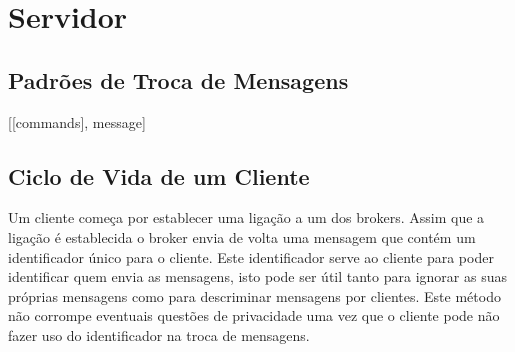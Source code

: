 \section{Servidor}

\subsection{Padrões de Troca de Mensagens}

[[commands], message]

\subsection{Ciclo de Vida de um Cliente}

Um cliente começa por establecer uma ligação a um dos brokers. Assim que a ligação é establecida o broker envia de volta uma mensagem que contém um identificador único para o cliente. Este identificador serve ao cliente para poder identificar quem envia as mensagens, isto pode ser útil tanto para ignorar as suas próprias mensagens como para descriminar mensagens por clientes. Este método não corrompe eventuais questões de privacidade uma vez que o cliente pode não fazer uso do identificador na troca de mensagens.
